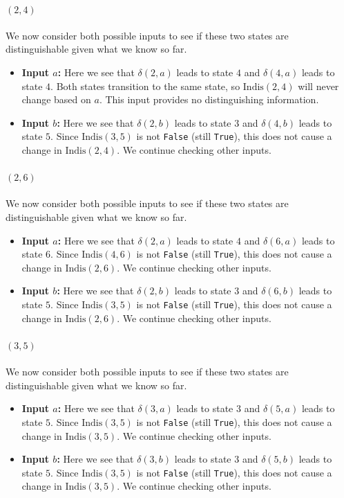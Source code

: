 \documentclass{article}
\begin{document}
\paragraph{$(2, 4)$} We now consider both possible inputs to see if these two states are distinguishable given what we know so far.
\begin{itemize}[itemsep=0.3em]
\item \textbf{Input $a$:} Here we see that $\delta(2, a)$ leads to state $4$ and $\delta(4, a)$ leads to state $4$.
  Both states transition to the same state, so $\text{Indis}(2, 4)$ will never change based on $a$. This input provides no distinguishing information.
\item \textbf{Input $b$:} Here we see that $\delta(2, b)$ leads to state $3$ and $\delta(4, b)$ leads to state $5$.
  Since $\text{Indis}(3, 5)$ is not \texttt{False} (still \texttt{True}), this does not cause a change in $\text{Indis}(2, 4)$. We continue checking other inputs.
\end{itemize}
\paragraph{$(2, 6)$} We now consider both possible inputs to see if these two states are distinguishable given what we know so far.
\begin{itemize}[itemsep=0.3em]
\item \textbf{Input $a$:} Here we see that $\delta(2, a)$ leads to state $4$ and $\delta(6, a)$ leads to state $6$.
  Since $\text{Indis}(4, 6)$ is not \texttt{False} (still \texttt{True}), this does not cause a change in $\text{Indis}(2, 6)$. We continue checking other inputs.
\item \textbf{Input $b$:} Here we see that $\delta(2, b)$ leads to state $3$ and $\delta(6, b)$ leads to state $5$.
  Since $\text{Indis}(3, 5)$ is not \texttt{False} (still \texttt{True}), this does not cause a change in $\text{Indis}(2, 6)$. We continue checking other inputs.
\end{itemize}
\paragraph{$(3, 5)$} We now consider both possible inputs to see if these two states are distinguishable given what we know so far.
\begin{itemize}[itemsep=0.3em]
\item \textbf{Input $a$:} Here we see that $\delta(3, a)$ leads to state $3$ and $\delta(5, a)$ leads to state $5$.
  Since $\text{Indis}(3, 5)$ is not \texttt{False} (still \texttt{True}), this does not cause a change in $\text{Indis}(3, 5)$. We continue checking other inputs.
\item \textbf{Input $b$:} Here we see that $\delta(3, b)$ leads to state $3$ and $\delta(5, b)$ leads to state $5$.
  Since $\text{Indis}(3, 5)$ is not \texttt{False} (still \texttt{True}), this does not cause a change in $\text{Indis}(3, 5)$. We continue checking other inputs.
\end{itemize}
\end{document}
